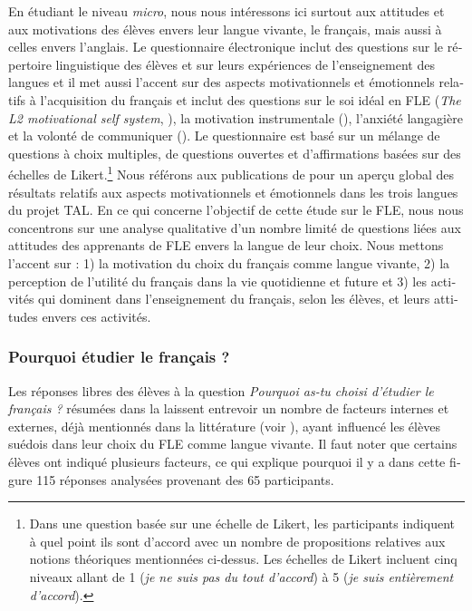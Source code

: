 \documentclass[french, output=paper]{langscibook}
\begin{document}
\begin{otherlanguage}{french}
En étudiant le niveau \textit{micro}, nous nous intéressons ici surtout aux attitudes et aux motivations des élèves envers leur langue vivante, le français, mais aussi à celles envers l’anglais. Le questionnaire électronique inclut des questions sur le répertoire linguistique des élèves et sur leurs expériences de l’enseignement des langues et il met aussi l’accent sur des aspects motivationnels et émotionnels relatifs à l’acquisition du français et inclut des questions sur le soi idéal en FLE (\textit{The L2 motivational self system}, \citealt{Dörnyei2009l2, RocherHahlin2020}), la motivation instrumentale (\citealt{GardnerLambert1972}), l’anxiété langagière \citep{HorwitzEtAl1986} et la volonté de communiquer (\citealt{McCroskeyBaer1985}). Le questionnaire est basé sur un mélange de questions à choix multiples, de questions ouvertes et d’affirmations basées sur des échelles de Likert.\footnote{Dans une question basée sur une échelle de Likert, les participants indiquent à quel point ils sont d’accord avec un nombre de propositions relatives aux notions théoriques mentionnées ci-dessus. Les échelles de Likert incluent cinq niveaux allant de 1 (\textit{je ne suis pas du tout d’accord}) à 5 (\textit{je suis entièrement d’accord}).} Nous référons aux publications de \citet{SayehliEtAl2022} pour un aperçu global des résultats relatifs aux aspects motivationnels et émotionnels dans les trois langues du projet TAL. En ce qui concerne l’objectif de cette étude sur le FLE, nous nous concentrons sur une analyse qualitative d’un nombre limité de questions liées aux attitudes des apprenants de FLE envers la langue de leur choix. Nous mettons l’accent sur : 1) la motivation du choix du français comme langue vivante, 2) la perception de l’utilité du français dans la vie quotidienne et future et 3) les activités qui dominent dans l’enseignement du français, selon les élèves, et leurs attitudes envers ces activités. 

\subsubsection{Pourquoi étudier le français ?}\largerpage

Les réponses libres des élèves à la question \textit{Pourquoi as-tu choisi d’étudier le français ?} résumées dans la  laissent entrevoir un nombre de facteurs internes et externes, déjà mentionnés dans la littérature (voir ), ayant influencé les élèves suédois dans leur choix du FLE comme langue vivante. Il faut noter que certains élèves ont indiqué plusieurs facteurs, ce qui explique pourquoi il y a dans cette figure 115 réponses analysées provenant des 65 participants.


\end{otherlanguage}
\end{document}
